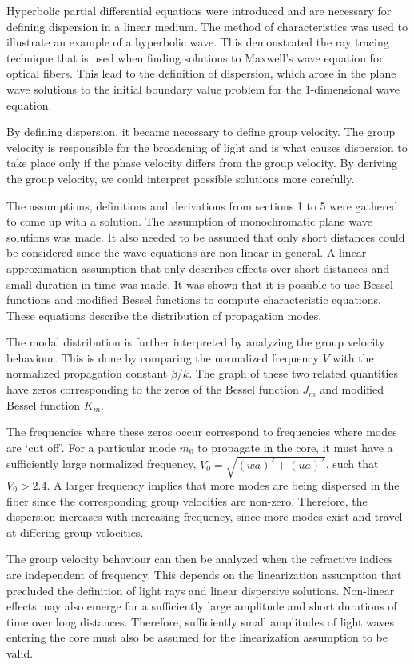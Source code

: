 \documentclass[12pt]{article}
\theoremstyle{definition}
\numberwithin{equation}{section}
\begin{document}
{Hyperbolic partial differential equations were introduced and are necessary for defining dispersion in a linear medium. The method of characteristics was used to illustrate an example of a hyperbolic wave. This demonstrated the ray tracing technique that is used when finding solutions to Maxwell's wave equation for optical fibers. This lead to the definition of dispersion, which arose in the plane wave solutions to the initial boundary value problem for the $1$-dimensional wave equation.

By defining dispersion, it became necessary to define group velocity. The group velocity is responsible for the broadening of light and is what causes dispersion to take place only if the phase velocity differs from the group velocity. By deriving the group velocity, we could interpret possible solutions more carefully.

The assumptions, definitions and derivations from sections 1 to 5 were gathered to come up with a solution. The assumption of monochromatic plane wave solutions was made. It also needed to be assumed that only short distances could be considered since the wave equations are non-linear in general. A linear approximation assumption that only describes effects over short distances and small duration in time was made. It was shown that it is possible to use Bessel functions and modified Bessel functions to compute characteristic equations. These equations describe the distribution of propagation modes.

The modal distribution is further interpreted by analyzing the group velocity behaviour. This is done by comparing the normalized frequency $V$ with the normalized propagation constant $\beta\slash k$. The graph of these two related quantities have zeros corresponding to the zeros of the Bessel function $J_m$ and modified Bessel function $K_m$.

The frequencies where these zeros occur correspond to frequencies where modes are `cut off'. For a particular mode $m_0$ to propagate in the core, it must have a sufficiently large normalized frequency, $V_0=\sqrt{(wa)^2+ (ua)^2}$, such that $V_0>2.4$. A larger frequency implies that more modes are being dispersed in the fiber since the corresponding group velocities are non-zero. Therefore, the dispersion increases with increasing frequency, since more modes exist and travel at differing group velocities.

The group velocity behaviour can then be analyzed when the refractive indices are independent of frequency. This depends on the linearization assumption that precluded the definition of light rays and linear dispersive solutions. Non-linear effects may also emerge for a sufficiently large amplitude and short durations of time over long distances. Therefore, sufficiently small amplitudes of light waves entering the core must also be assumed for the linearization assumption to be valid.

}
\end{document}

